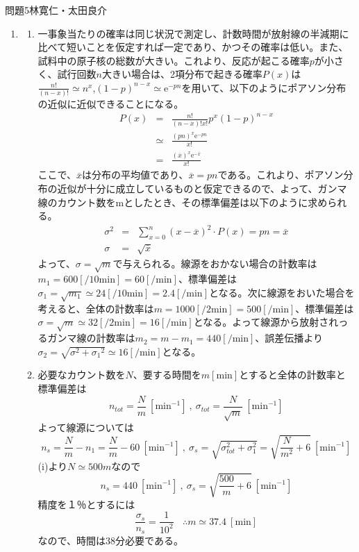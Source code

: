 \documentclass[fleqn]{jbook}
\begin{document}
\begin{answer}{問題5}{林寛仁・太田良介}
\begin{enumerate}
\begin{enumerate}
\end{enumerate}
\item 
\begin{enumerate}
	\item 一事象当たりの確率は同じ状況で測定し、計数時間が放射線の半減期に比べて短いことを仮定すれば一定であり、かつその確率は低い。また、試料中の原子核の総数が大きい。これより、反応が起こる確率$p$が小さく、試行回数$n$大きい場合は、2項分布で起きる確率$P(x)$は$\frac{n!}{(n-x)!} \simeq n^x$,$(1-p)^{n-x} \simeq \mathrm{e} ^{-pn}$を用いて、以下のようにポアソン分布の近似に近似できることになる。
\begin{eqnarray}
	P(x) &=& \frac{n!}{(n-x)!x!}p^x(1-p)^{n-x}				\nonumber \\
		&\simeq& \frac{\left(pn\right)^x \mathrm{e} ^{-pn} }{x!} \nonumber \\
		&=& \frac{\left(\overline{x}\right)^x \mathrm{e} ^{-\overline{x}}}{x!}
		\nonumber
\end{eqnarray}
ここで、$\overline{x}$は分布の平均値であり、$\overline{x} = pn$である。これより、ポアソン分布の近似が十分に成立しているものと仮定できるので、よって、ガンマ線のカウント数をmとしたとき、その標準偏差は以下のように求められる。
\begin{eqnarray}
	\sigma ^2 &=& \sum_{x=0}^{n} (x- \overline{x})^2 \cdot P(x) 
		= pn								
		= \overline{x}					\nonumber \\
	\sigma &=& \sqrt{\overline{x}}			\nonumber
\end{eqnarray}
よって、$\sigma=\sqrt{m}$で与えられる。線源をおかない場合の計数率は$m_1=600[/10\mathrm{min}]=60[/\mathrm{min}]$、標準偏差は$\sigma_1=\sqrt{m_1}\simeq 24[/10\mathrm{min}]=2.4[/\mathrm{min}]$となる。次に線源をおいた場合を考えると、全体の計数率は$m=1000[/2\mathrm{min}]=500[/\mathrm{min}]$、標準偏差は$\sigma=\sqrt{m}\simeq 32[/2\mathrm{min}]=16[/\mathrm{min}]$となる。よって線源から放射されっるガンマ線の計数率は$m_2=m-m_1=440[/\mathrm{min}]$、誤差伝播より$\sigma_2=\sqrt{\sigma^2+{\sigma_1}^2}\simeq 16[/\mathrm{min}]$となる。
	\item 必要なカウント数を$N$、要する時間を$m[\mathrm{min}]$とすると全体の計数率と標準偏差は
\begin{equation}
n_{tot}=\frac{N}{m} \ [\mathrm{min}^{-1}] \ , \ 
\sigma_{tot}=\frac{N}{\sqrt{m}} \ [\mathrm{min}^{-1}]
\end{equation}
よって線源については
\begin{equation}
n_s=\frac{N}{m}-n_1=\frac{N}{m}-60 \ [\mathrm{min}^{-1}] \ , \ 
\sigma_s=\sqrt{\sigma_{tot}^2+\sigma_1^2}
=\sqrt{\frac{N}{m^2}+6} \ [\mathrm{min}^{-1}]  
\end{equation}
(i)より$N\simeq 500m$なので
\begin{equation}
n_s=440 \ [\mathrm{min}^{-1}] \ , \ \sigma_s=
\sqrt{\frac{500}{m}+6} \ [\mathrm{min}^{-1}]
\end{equation}
精度を１％とするには
\begin{equation}
\frac{\sigma_s}{n_s}=\frac{1}{10^2} \ \ \ \ \therefore
m\simeq 37.4 \ [\mathrm{min}]
\end{equation}
なので、時間は$38$分必要である。
\end{enumerate}


\end{enumerate}
\end{answer}
\end{document}
